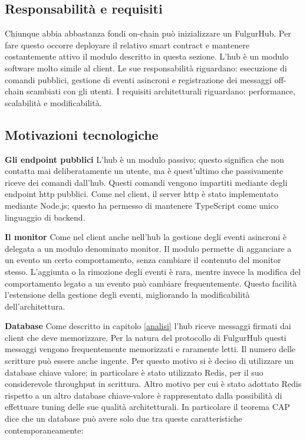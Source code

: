 \documentclass[12pt,italian,]{book}
\begin{document}
\hypertarget{responsabilituxe0-e-requisiti-2}{%
\subsection{Responsabilità e requisiti}\label{responsabilituxe0-e-requisiti-2}}

Chiunque abbia abbastanza fondi on-chain può inizializzare un FulgurHub. Per fare questo occorre deployare il relativo smart contract e mantenere costantemente attivo il modulo descritto in questa sezione. L'hub è un modulo software molto simile al client. Le sue responsabilità riguardano: esecuzione di comandi pubblici, gestione di eventi asincroni e registrazione dei messaggi off-chain scambiati con gli utenti. I requisiti architetturali riguardano: performance, scalabilità e modificabilità.

\hypertarget{motivazioni-tecnologiche-2}{%
\subsection{Motivazioni tecnologiche}\label{motivazioni-tecnologiche-2}}

\textbf{\textbf{Gli endpoint pubblici}} L'hub è un modulo passivo; questo significa che non contatta mai deliberatamente un utente, ma è quest'ultimo che passivamente riceve dei comandi dall'hub. Questi comandi vengono impartiti mediante degli endpoint http pubblici. Come nel client, il server http è stato implementato mediante Node.js; questo ha permesso di mantenere TypeScript come unico linguaggio di backend.

\textbf{\textbf{Il monitor}} Come nel client anche nell'hub la gestione degli eventi asincroni è delegata a un modulo denominato monitor. Il modulo permette di agganciare a un evento un certo comportamento, senza cambiare il contenuto del monitor stesso. L'aggiunta o la rimozione degli eventi è rara, mentre invece la modifica del comportamento legato a un evento può cambiare frequentemente. Questo facilità l'estensione della gestione degli eventi, migliorando la modificabilità dell'architettura.

\textbf{\textbf{Database}} Come descritto in capitolo \ref{analisi} l'hub riceve messaggi firmati dai client che deve memorizzare. Per la natura del protocollo di FulgurHub questi messaggi vengono frequentemente memorizzati e raramente letti. Il numero delle scritture può essere anche ingente. Per questo motivo si è deciso di utilizzare un database chiave valore; in particolare è stato utilizzato Redis, per il suo considerevole throughput in scrittura. Altro motivo per cui è stato adottato Redis rispetto a un altro database chiave-valore è rappresentato dalla possibilità di effettuare tuning delle sue qualità architetturali. In particolare il teorema CAP dice che un database può avere solo due tra queste caratteristiche contemporaneamente:
\end{document}

